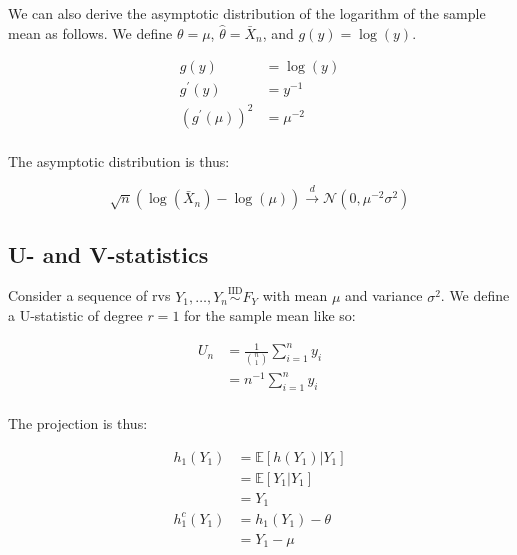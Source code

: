 \documentclass{report}
\begin{document}
We can also derive the asymptotic distribution of the logarithm of the sample mean as follows. We define $\theta = \mu$, $\hat{\theta} = \bar{X}_n$, and $g(y) = \log(y)$. 

\begin{equation}\label{eq:ex-lst-delta-method-log-1}
    \begin{aligned}
      g(y) &= \log(y) \\
      g^\prime(y) &= y^{-1} \\
      \left(g^\prime(\mu)\right)^2 &= \mu^{-2} \\
    \end{aligned}
\end{equation}

The asymptotic distribution is thus:

\begin{equation}\label{eq:ex-lst-delta-method-log-2}
\sqrt{n}\left(\log\left(\bar{X}_n\right) - \log(\mu)\right) \overset{d}{\to} \mathcal{N}(0, \mu^{-2}\sigma^2)
\end{equation}

\subsection{U- and V-statistics}

Consider a sequence of \glspl{rv} $Y_1, \dots, Y_n \overset{\text{IID}}{\sim} F_Y$ with mean $\mu$ and variance $\sigma^2$. We define a U-statistic of degree $r = 1$ for the sample mean like so:

\begin{equation}\label{eq:ex-lst-u-statistic-mean}
    \begin{aligned}
      U_n 
        &= \frac{1}{\binom{n}{1}} \sum_{i=1}^n y_i \\
        &= n^{-1} \sum_{i=1}^n y_i \\
    \end{aligned}
\end{equation}

The projection is thus:

\begin{equation}\label{eq:ex-lst-u-statistic-mean-projection}
    \begin{aligned}
      h_1(Y_1)
        &= \mathbb{E}[h(Y_1) | Y_1] \\
        &= \mathbb{E}[Y_1 | Y_1] \\
        &= Y_1 \\
      h_1^c(Y_1)
        &= h_1(Y_1) - \theta \\
        &= Y_1 - \mu \\
    \end{aligned}
\end{equation}
\end{document}
